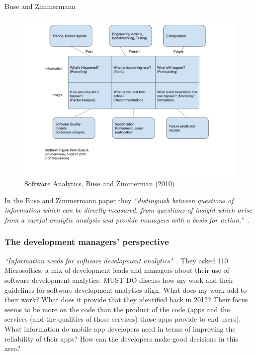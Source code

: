 Buse and Zimmermann
\begin{figure}
    \centering
    \includegraphics[width=14cm]{images/Buse_and_Zimmermann_2010_figure.png}
    \caption{Software Analytics, Buse and Zimmerman (2010)}
    \label{fig:software_analytics_buse_and_zimmerman_2010}
\end{figure}
\afterpage{\clearpage}


In the Buse and Zimmermann paper they \emph{``distinguish between questions of information which can be directly measured, from questions of insight which arise from a careful analytic analysis and provide managers with a basis for action.''}~\cite{buse_analytics_2010}.

\subsubsection{The development managers' perspective}
\emph{``Information needs for software development analytics"}~\cite{buse2012_information_needs_for_software_development_analytics}. They asked 110 Microsofties, a mix of development leads and managers about their use of software development analytics. MUST-DO discuss how my work and their guidelines for software development analytics align. What does my work add to their work? What does it provide that they identified back in 2012? Their focus seems to be more on the code than the product of the code (apps and the services (and the qualities of those services) those apps provide to end users). What information do mobile app developers need in terms of improving the reliability of their apps? How can the developers make good decisions in this area?

